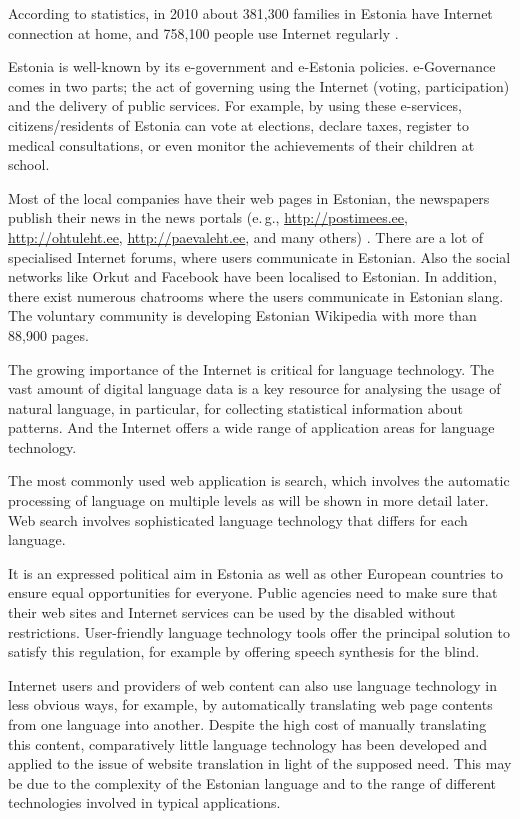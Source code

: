 \begin{multicols}{2}
According to statistics, in 2010 about 381,300 families in Estonia have Internet connection at home, and 758,100 people use Internet regularly \cite{Stat3}. 


Estonia is well-known by its e-government and e-Estonia policies. 
e-Governance comes in two parts; the act of governing using the Internet (voting, participation) and the delivery of public services. 
For example, by using these e-services, citizens/residents of Estonia can vote at elections, declare taxes, register to medical consultations, or even monitor the achievements of their children at school. 

Most of the local companies have their web pages in Estonian, the newspapers publish their news in the news portals (e.\,g., \url{http://postimees.ee}, \url{http://ohtuleht.ee}, \url{http://paevaleht.ee}, and many others) \cite{Neti}.  There are a lot of specialised Internet forums, where users communicate in Estonian.  Also the social networks like Orkut and Facebook have been localised to Estonian.  In addition, there exist numerous chatrooms where the users communicate in Estonian slang.  The voluntary community is developing Estonian Wikipedia with more than 88,900 pages.

The growing importance of the Internet is critical for language technology.  The vast amount of digital language data is a key resource for analysing the usage of natural language, in particular, for collecting statistical information about patterns.  And the Internet offers a wide range of application areas for language technology.

The most commonly used web application is search, which involves the automatic processing of language on multiple levels as will be shown in more detail later.  Web search involves sophisticated language technology that differs for each language.

It is an expressed political aim in Estonia as well as other European countries to ensure equal opportunities for everyone.  Public agencies need to make sure that their web sites and Internet services can be used by the disabled without restrictions.  User-friendly language technology tools offer the principal solution to satisfy this regulation, for example by offering speech synthesis for the blind.

Internet users and providers of web content can also use language technology in less obvious ways, for example, by automatically translating web page contents from one language into another.  Despite the high cost of manually translating this content, comparatively little language technology has been developed and applied to the issue of website translation in light of the supposed need.  This may be due to the complexity of the Estonian language and to the range of different technologies involved in typical applications.


\end{multicols}
